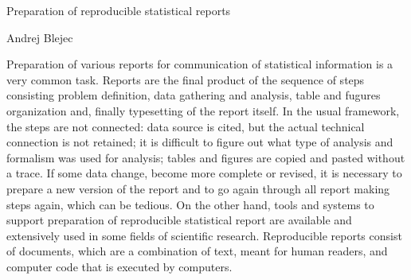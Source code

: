 Preparation of reproducible statistical reports

Andrej Blejec

Preparation of various reports for communication of statistical information is a very common task. Reports are the final product of the sequence of steps consisting problem definition, data gathering and analysis, table and fugures organization and, finally typesetting of the report itself. In the usual framework, the steps are not connected: data source is cited, but the actual technical connection is not retained; it is difficult to figure out what type of analysis and formalism was used for analysis; tables and figures are copied and pasted without a trace. If some data change, become more complete or revised, it is necessary to prepare a new version of the report and to go again through all report making steps again, which can be tedious.
On the other hand, tools and systems to support preparation of reproducible statistical report are available and extensively used in some fields of scientific research. Reproducible reports consist of documents, which are a combination of text, meant for human readers, and computer code that is executed by computers. 